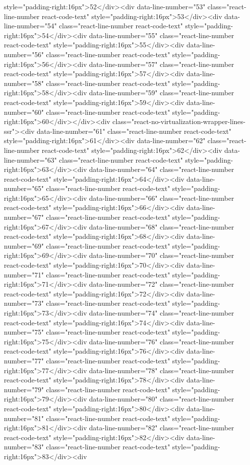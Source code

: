 {{{{{style="padding-right:16px">52</div><div data-line-number="53" class="react-line-number react-code-text" style="padding-right:16px">53</div><div data-line-number="54" class="react-line-number react-code-text" style="padding-right:16px">54</div><div data-line-number="55" class="react-line-number react-code-text" style="padding-right:16px">55</div><div data-line-number="56" class="react-line-number react-code-text" style="padding-right:16px">56</div><div data-line-number="57" class="react-line-number react-code-text" style="padding-right:16px">57</div><div data-line-number="58" class="react-line-number react-code-text" style="padding-right:16px">58</div><div data-line-number="59" class="react-line-number react-code-text" style="padding-right:16px">59</div><div data-line-number="60" class="react-line-number react-code-text" style="padding-right:16px">60</div></div><div class="react-no-virtualization-wrapper-lines-ssr"><div data-line-number="61" class="react-line-number react-code-text" style="padding-right:16px">61</div><div data-line-number="62" class="react-line-number react-code-text" style="padding-right:16px">62</div><div data-line-number="63" class="react-line-number react-code-text" style="padding-right:16px">63</div><div data-line-number="64" class="react-line-number react-code-text" style="padding-right:16px">64</div><div data-line-number="65" class="react-line-number react-code-text" style="padding-right:16px">65</div><div data-line-number="66" class="react-line-number react-code-text" style="padding-right:16px">66</div><div data-line-number="67" class="react-line-number react-code-text" style="padding-right:16px">67</div><div data-line-number="68" class="react-line-number react-code-text" style="padding-right:16px">68</div><div data-line-number="69" class="react-line-number react-code-text" style="padding-right:16px">69</div><div data-line-number="70" class="react-line-number react-code-text" style="padding-right:16px">70</div><div data-line-number="71" class="react-line-number react-code-text" style="padding-right:16px">71</div><div data-line-number="72" class="react-line-number react-code-text" style="padding-right:16px">72</div><div data-line-number="73" class="react-line-number react-code-text" style="padding-right:16px">73</div><div data-line-number="74" class="react-line-number react-code-text" style="padding-right:16px">74</div><div data-line-number="75" class="react-line-number react-code-text" style="padding-right:16px">75</div><div data-line-number="76" class="react-line-number react-code-text" style="padding-right:16px">76</div><div data-line-number="77" class="react-line-number react-code-text" style="padding-right:16px">77</div><div data-line-number="78" class="react-line-number react-code-text" style="padding-right:16px">78</div><div data-line-number="79" class="react-line-number react-code-text" style="padding-right:16px">79</div><div data-line-number="80" class="react-line-number react-code-text" style="padding-right:16px">80</div><div data-line-number="81" class="react-line-number react-code-text" style="padding-right:16px">81</div><div data-line-number="82" class="react-line-number react-code-text" style="padding-right:16px">82</div><div data-line-number="83" class="react-line-number react-code-text" style="padding-right:16px">83</div><div }}}}}
